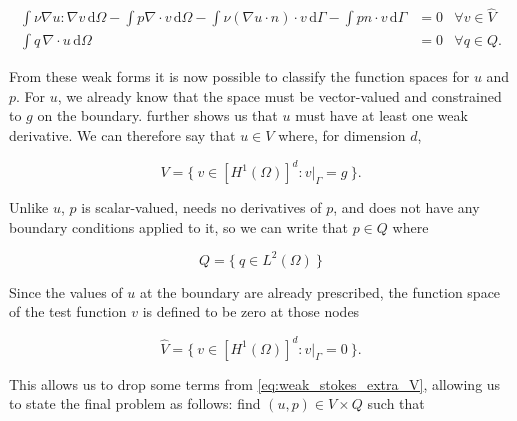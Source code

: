 \documentclass[thesis]{subfiles}
\begin{document}
\begin{subequations}
  \begin{align}
    \int \nu \nabla u : \nabla v \, \textrm{d}\Omega
    - \int p \nabla \cdot v \, \textrm{d}\Omega
    - \int \nu (\nabla u \cdot n) \cdot v \, \textrm{d}\Gamma
    - \int p n \cdot v \, \textrm{d}\Gamma
    &= 0
    &\forall v \in \hat V
    \label{eq:weak_stokes_extra_V} \\
    \int q \, \nabla \cdot u \, \textrm{d}\Omega
    &= 0
    &\forall q \in Q.
  \end{align}
\end{subequations}

From these weak forms it is now possible to classify the function spaces for $u$ and $p$.
For $u$, we already know that the space must be vector-valued and constrained to $g$ on the boundary.
 further shows us that $u$ must have at least one weak derivative.
We can therefore say that $u \in V$ where, for dimension $d$,

\begin{equation}
  V = \{ \ v \in [H^1(\Omega)]^d : v |_{\Gamma} = g \ \}.
  \label{eq:stokes_velocity_space}
\end{equation}

Unlike $u$, $p$ is scalar-valued, needs no derivatives of $p$, and does not have any boundary conditions applied to it, so we can write that $p \in Q$ where

\begin{equation}
  Q = \{ \ q \in L^2(\Omega) \ \}
  \label{eq:stokes_pressure_space}
\end{equation}


Since the values of $u$ at the boundary are already prescribed, the function space of the test function $v$ is defined to be zero at those nodes

\begin{equation}
  \hat V = \{\ v \in [H^1(\Omega)]^d : v|_{\Gamma} = 0 \ \}.
\end{equation}

This allows us to drop some terms from \cref{eq:weak_stokes_extra_V}, allowing us to state the final problem as follows: find $(u, p) \in V \times Q$ such that
\end{document}
